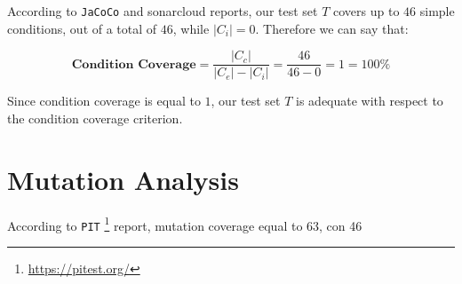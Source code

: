 \documentclass[conference]{IEEEtran}
\newcommand{\abs}[1]{\left|#1\right|}
\begin{document}
According to \texttt{JaCoCo} and sonarcloud reports, our test set $T$ covers up to $46$ simple conditions, out of a total of $46$, while $\abs{C_i} = 0$. Therefore we can say that:

\begin{equation} 
\textbf{Condition Coverage} = \dfrac{\abs{C_c}}{\abs{C_e} - \abs{C_i}} = \dfrac{46}{46-0} = 1 = 100\%
\end{equation}

Since condition coverage is equal to $1$, our test set $T$ is adequate with respect to the condition coverage criterion. 


\section{Mutation Analysis}


According to \texttt{PIT} \footnote{\url{https://pitest.org/}} report, mutation coverage equal to 63, con 46 





\end{document}
